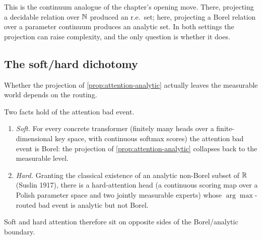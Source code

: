 This is the continuum analogue of the chapter's opening move. There, projecting a decidable relation over $\mathbb{N}$ produced an r.e.\ set; here, projecting a Borel relation over a parameter continuum produces an analytic set. In both settings the projection can raise complexity, and the only question is whether it does.

\subsection{The soft/hard dichotomy}

Whether the projection of \cref{prop:attention-analytic} actually leaves the measurable world depends on the routing.

\begin{prop}
\label{prop:soft-hard-descriptive}
Two facts hold of the attention bad event.
\begin{enumerate}[leftmargin=*,itemsep=2pt]
\item \emph{Soft.} For every concrete transformer (finitely many heads over a finite-dimensional key space, with continuous softmax scores) the attention bad event is Borel: the projection of \cref{prop:attention-analytic} collapses back to the measurable level.
\item \emph{Hard.} Granting the classical existence of an analytic non-Borel subset of $\mathbb{R}$ (Suslin 1917), there is a hard-attention head (a continuous scoring map over a Polish parameter space and two jointly measurable experts) whose $\arg\max$-routed bad event is analytic but not Borel.
\end{enumerate}
Soft and hard attention therefore sit on opposite sides of the Borel/analytic boundary.
\end{prop}

